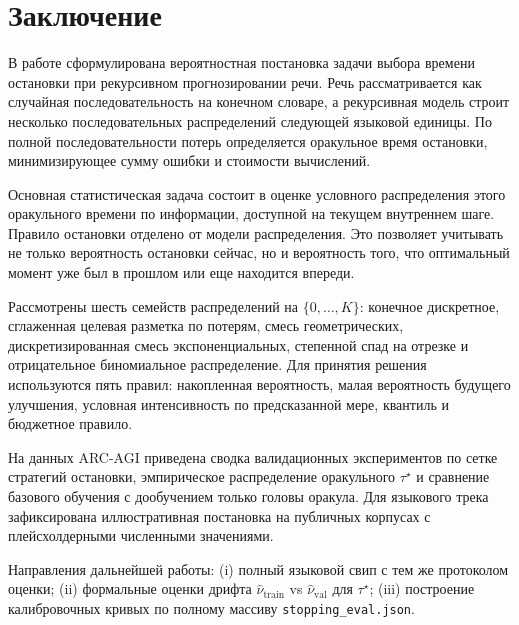 \section{Заключение}

В работе сформулирована вероятностная постановка задачи выбора времени остановки при рекурсивном прогнозировании речи. Речь рассматривается как случайная последовательность на конечном словаре, а рекурсивная модель строит несколько последовательных распределений следующей языковой единицы. По полной последовательности потерь определяется оракульное время остановки, минимизирующее сумму ошибки и стоимости вычислений.

Основная статистическая задача состоит в оценке условного распределения этого оракульного времени по информации, доступной на текущем внутреннем шаге. Правило остановки отделено от модели распределения. Это позволяет учитывать не только вероятность остановки сейчас, но и вероятность того, что оптимальный момент уже был в прошлом или еще находится впереди.

Рассмотрены шесть семейств распределений на \(\{0,\ldots,K\}\): конечное дискретное, сглаженная целевая разметка по потерям, смесь геометрических, дискретизированная смесь экспоненциальных, степенной спад на отрезке и отрицательное биномиальное распределение. Для принятия решения используются пять правил: накопленная вероятность, малая вероятность будущего улучшения, условная интенсивность по предсказанной мере, квантиль и бюджетное правило.

На данных ARC-AGI приведена сводка валидационных экспериментов по сетке стратегий остановки, эмпирическое распределение оракульного \(\tau^\star\) и сравнение базового обучения с дообучением только головы оракула. Для языкового трека зафиксирована иллюстративная постановка на публичных корпусах с плейсхолдерными численными значениями.

Направления дальнейшей работы: (i) полный языковой свип с тем же протоколом оценки; (ii) формальные оценки дрифта \(\widehat\nu_{\mathrm{train}}\) vs \(\widehat\nu_{\mathrm{val}}\) для \(\tau^\star\); (iii) построение калибровочных кривых по полному массиву \texttt{stopping\_eval.json}.
